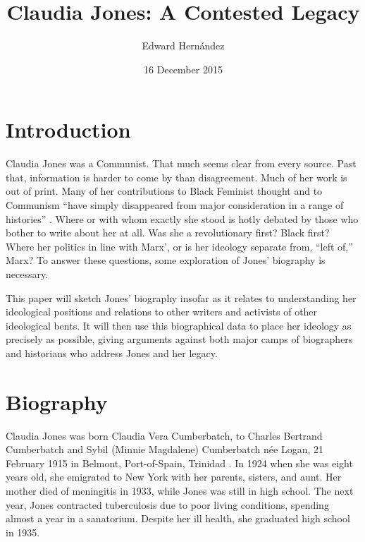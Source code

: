 \documentclass[man,12pt,natbib]{apa6}
\begin{document}
\title{Claudia Jones: A Contested Legacy}
\author{Edward Hern\'{a}ndez}
\date{16 December 2015}
\maketitle


\section{Introduction}

Claudia Jones was a Communist. That much seems clear from every source. Past
that, information is harder to come by than disagreement.  Much of her work is
out of print. Many of her contributions to Black Feminist thought and to
Communism ``have simply disappeared from major consideration in a range of
histories'' \citep[Ch.~1]{Davies11}. Where or with whom exactly she stood is
hotly debated by those who bother to write about her at all. Was she a
revolutionary first? Black first? Where her politics in line with Marx', or is
her ideology separate from, ``left of,'' \citep{Davies11} Marx?  To answer
these questions, some exploration of Jones' biography is necessary.

This paper will sketch Jones' biography insofar as it relates to understanding
her ideological positions and relations to other writers and activists of other
ideological bents. It will then use this biographical data to place her
ideology as precisely as possible, giving arguments against both major camps of
biographers and historians who address Jones and her legacy.

\section{Biography}

Claudia Jones was born Claudia Vera Cumberbatch, to Charles Bertrand
Cumberbatch and Sybil (Minnie Magdalene) Cumberbatch n{\'{e}}e Logan, 21
February 1915 in Belmont, Port-of-Spain, Trinidad
\citep[Chronology~section]{Davies08}. In 1924 when she was eight years old, she
emigrated to New York with her parents, sisters, and aunt. Her mother died of 
meningitis in 1933, while Jones was still in high school. The next year, Jones
contracted tuberculosis due to poor living conditions, spending almost a year
in a sanatorium. Despite her ill health, she graduated high school in 1935.
\end{document}
